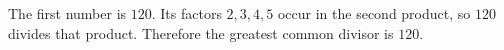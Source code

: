 The first number is $120$. Its factors $2,3,4,5$ occur in the second product, so $120$ divides that product. Therefore the greatest common divisor is $\boxed{120}$.
